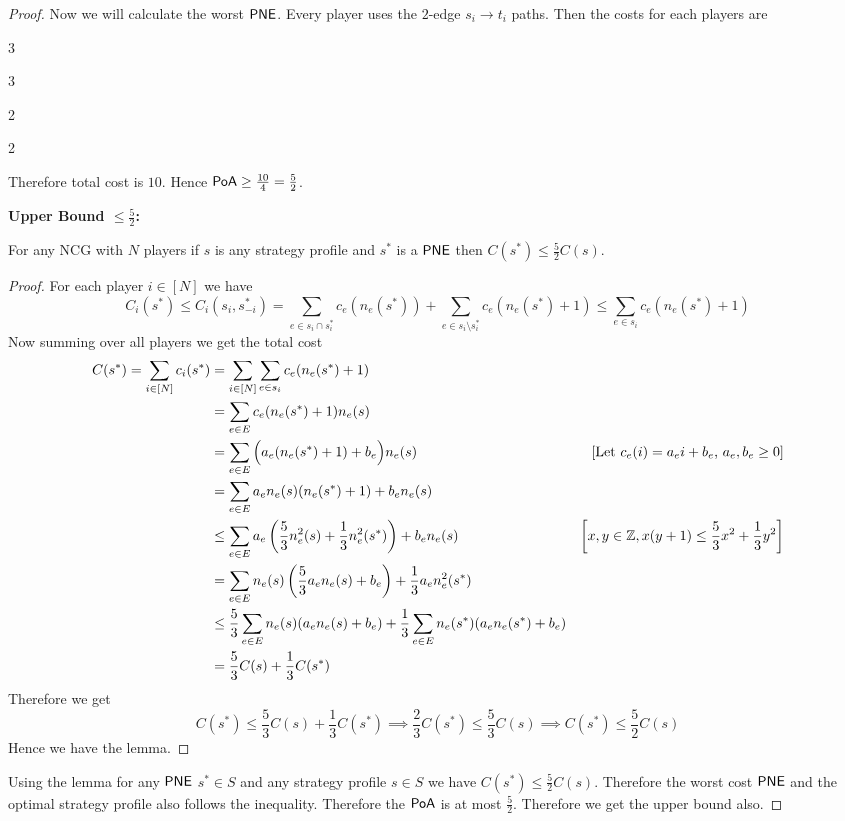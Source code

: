 \begin{proof}
\begin{minipage}{0.57\textwidth}
	Now we will calculate the worst $\operatorname{\mathsf{PNE}}$. Every player uses the $2$-edge $s_i\to t_i$ paths. Then the costs for each players are 
	
		\begin{enumerate*}[label=\arabic*:, itemjoin={,\   }, itemjoin*={,\   }]
		\item 3
		\item 3
		\item 2
		\item 2
	\end{enumerate*}\parinf

Therefore total cost is $10$. Hence $\operatorname{\mathsf{PoA}}\geq \frac{10}4=\frac52$.
\end{minipage}

\newpage
\parinf

\textbf{Upper Bound $\leq \frac52$:}
\vspace*{2mm}
\begin{claimwidth}
\begin{lemma}{}{}
	For any NCG with $N$ players if $s$ is any strategy profile and $s^*$ is a $\operatorname{\mathsf{PNE}}$ then $C(s^*)\leq \frac52 C(s)$.
\end{lemma}
\begin{proof}
	For each player $i\in [N]$ we have 
	\[	C_i(s^*)  \leq C_i(s_i,s_{-i}^*) = \sum\limits_{e\in s_i\cap s_i^*}c_e(n_e(s^*))+\sum\limits_{e\in s_i\setminus s_i^*} c_e(n_e(s^*)+1)\leq \sum\limits_{e\in s_i}c_e(n_e(s^*)+1)\] Now summing over all players we get the total cost \begin{align*}
		C(s^*) =\sum\limits_{i\in[N]}c_i(s^*) & = \sum\limits_{i\in[N]}\sum\limits_{e\in s_i}c_e(n_e(s^*)+1)\\
		& =\sum\limits_{e\in E}c_e(n_e(s^*)+1)n_e(s)\\
		& = \sum\limits_{e\in E}\Big(a_e(n_e(s^*)+1)+b_e\Big)n_e(s)& [\text{Let $c_e(i)=a_ei+b_e$, $a_e,b_e\geq  0$}]\\
		& = \sum\limits_{e\in E}a_en_e(s)(n_e(s^*)+1)+b_en_e(s)\\
		& \leq \sum\limits_{e\in E}a_e\left(\frac53n_e^2(s)+\frac13n_e^2(s^*)\right)+b_en_e(s) & \left[x,y\in\mathbb{Z},x(y+1)\leq \frac53x^2+\frac13y^2\right]\\
		& = \sum\limits_{e\in E}n_e(s)\left(\frac53a_en_e(s)+b_e\right)+\frac13a_en_e^2(s^*)\\
		& \leq \frac53\sum\limits_{e\in E}n_e(s)(a_en_e(s)+b_e)+\frac13 \sum\limits_{e\in E}n_e(s^*)(a_en_e(s^*)+b_e)\\
		& = \frac53C(s)+\frac13C(s^*) 
	\end{align*}
Therefore we get $$C(s^*)\leq \frac53C(s)+\frac13C(s^*)\implies \frac23C(s^*)\leq \frac53C(s)\implies C(s^*)\leq \frac52C(s)$$Hence we have the lemma.
\end{proof}
\end{claimwidth}


Using the lemma for any $\operatorname{\mathsf{PNE}}$ $s^*\in S$ and any strategy profile $s\in S$ we have $C(s^*)\leq \frac52C(s)$. Therefore the worst cost $\operatorname{\mathsf{PNE}}$ and the optimal strategy profile  also follows the inequality. Therefore the $\operatorname{\mathsf{PoA}}$ is at most $\frac52$. Therefore we get the upper bound also.
\end{proof}

